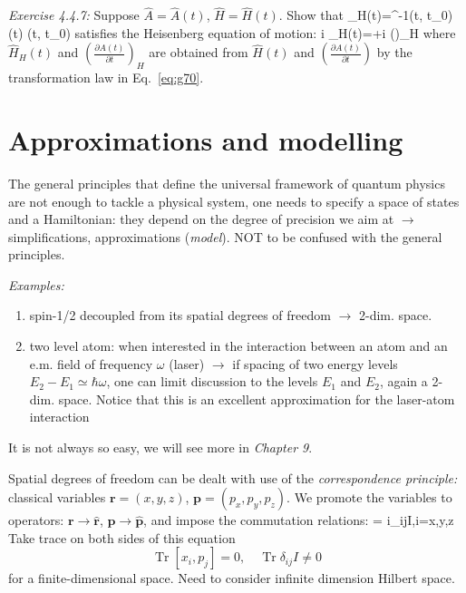 \documentclass[12pt]{article}
\begin{document}
\emph{Exercise 4.4.7:} Suppose $\hat{A} = \hat{A}(t)$, $\hat{H} = \hat{H}(t)$.
Show that
\be
{}_{H}(t)=^{-1}\left(t, t_{0}\right) (t) \left(t, t_{0}\right)
\label{eq:g70}
\ee
satisfies the Heisenberg equation of motion:
\be
i \hbar {} _{H}(t)=+i \hbar\left(\right)_{H}
\ee
where $\hat{H}_{H}(t)$ and $\left(\frac{\partial A(t)}{\partial t}\right)_{H}$ are obtained 
from $\hat{H}(t)$ and $\left(\frac{\partial A(t)}{\partial t}\right)$ by the transformation
law in Eq.~\eqref{eq:g70}.


\section{Approximations and modelling} 

The general principles that define the universal
framework of quantum physics
are not enough to tackle
a physical system, one needs to
specify a space of states and a
Hamiltonian: they depend on the
degree of precision we aim at
$\to$ simplifications, approximations (\emph{model}).
NOT to be confused with the general principles.

\emph{Examples:}
 
\begin{enumerate}
\item spin-1/2 decoupled from its spatial
degrees of freedom $\to$ 2-dim. space.
\item two level atom: when interested in
the interaction between an atom and
an e.m. field of frequency $\omega$ (laser)
$\to$ if spacing of two energy levels 
$E_2-E_1 \simeq \hbar \omega$, one can limit
discussion to the levels $E_1$ and $E_2$,
again a 2-dim. space.
Notice that this is an excellent approximation 
for the laser-atom interaction
\end{enumerate}


It is not always so easy, we will see more in \emph{Chapter 9}.

Spatial degrees of freedom can be dealt with
use of the \emph{correspondence principle:}
classical variables $\mathbf{r} = (x,y,z)$, $\mathbf{p} = (p_x,p_y,p_z)$.
We promote the variables to operators:
$\mathbf{r} \to \hat{\mathbf{r}}$,
$\mathbf{p} \to \hat{\mathbf{p}}$,
and impose the commutation relations:
\be
[x_i,p_j] = i\hbar \delta_{ij}I,\quad i=x,y,z
\ee
Take trace on both sides of this equation
\[
\operatorname{Tr}\left[x_{i}, p_{j}\right]=0,\quad \operatorname{Tr} \delta_{i j} I \neq 0
\]
for a finite-dimensional space.
Need to consider infinite dimension Hilbert space.
\end{document}
